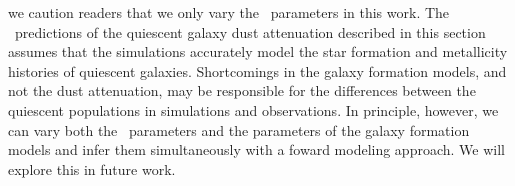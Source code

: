 we caution readers
that we only vary the \eda~parameters in this work.     
The \eda~predictions of the quiescent galaxy dust attenuation described in this
section assumes that the simulations accurately model the star formation and
metallicity histories of quiescent galaxies. 
Shortcomings in the galaxy formation models, and not the dust attenuation, may
be responsible for the differences between the quiescent populations in
simulations and observations. 
In principle, however, we can vary both the \eda~parameters and the parameters
of the galaxy formation models and infer them simultaneously with a foward
modeling approach. 
We will explore this in future work. 
